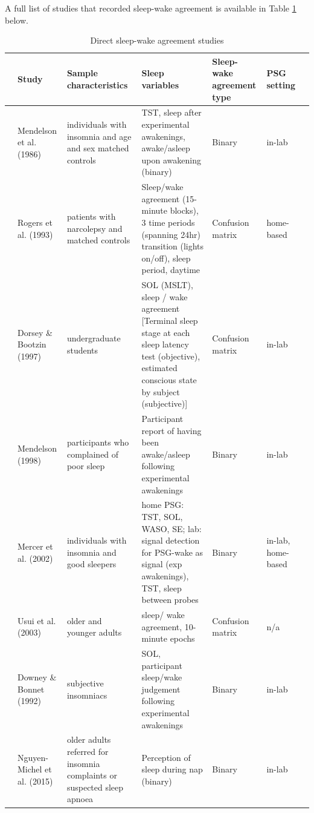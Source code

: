 \documentclass[
]{article}
\begin{document}
\newpage

A full list of studies that recorded sleep-wake agreement is available in Table \ref{tab:sleepwake} below.

\begin{table}[!h]
\centering
\caption{\label{tab:sleepwake}Direct sleep-wake agreement studies}
\centering
\fontsize{8}{10}\selectfont
\begin{threeparttable}
\begin{tabular}[t]{>{\raggedright\arraybackslash}p{2em}>{\raggedright\arraybackslash}p{6em}>{\raggedright\arraybackslash}p{12em}>{\raggedright\arraybackslash}p{16em}>{\raggedright\arraybackslash}p{6em}>{\raggedright\arraybackslash}p{6em}>{}p{6em}}
\toprule
  & Study & Sample characteristics & Sleep variables & Sleep-wake agreement type & PSG setting\\
\midrule
60 & Mendelson et al. (1986) & individuals with insomnia and age and sex matched controls & TST, sleep after experimental awakenings, awake/asleep upon awakening (binary) & Binary & in-lab\\
73 & Rogers et al. (1993) & patients with narcolepsy and matched controls & Sleep/wake agreement (15-minute blocks), 3 time periods (spanning 24hr) transition (lights on/off), sleep period, daytime & Confusion matrix & home-based\\
101 & Dorsey \& Bootzin (1997) & undergraduate students & SOL (MSLT), sleep / wake agreement [Terminal sleep stage at each sleep latency test (objective), estimated conscious state by subject (subjective)] & Confusion matrix & in-lab\\
123 & Mendelson (1998) & participants who complained of poor sleep & Participant report of having been awake/asleep following experimental awakenings & Binary & in-lab\\
124 & Mercer et al. (2002) & individuals with insomnia and good sleepers & home PSG: TST, SOL, WASO, SE; lab: signal detection for PSG-wake as signal (exp awakenings), TST, sleep between probes & Binary & in-lab, home-based\\
\addlinespace
139 & Usui et al. (2003) & older and younger adults & sleep/ wake agreement, 10-minute epochs & Confusion matrix & n/a\\
152 & Downey \& Bonnet (1992) & subjective insomniacs & SOL, participant sleep/wake judgement following experimental awakenings & Binary & in-lab\\
165 & Nguyen-Michel et al. (2015) & older adults referred for insomnia complaints or suspected sleep apnoea & Perception of sleep during nap (binary) & Binary & in-lab\\

\end{tabular}
\end{threeparttable}
\end{table}
\end{document}
